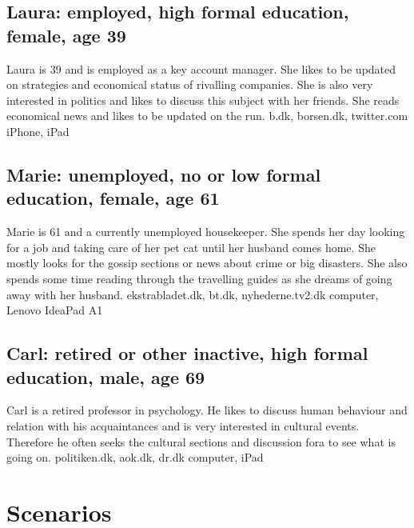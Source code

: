 \subsection{Laura: employed, high formal education, female, age 39}
Laura is 39 and is employed as a key account manager. She likes to be updated on strategies and economical status of rivalling companies. She is also very interested in politics and likes to discuss this subject with her friends. She reads economical news and likes to be updated on the run.
b.dk, borsen.dk, twitter.com
iPhone, iPad

\subsection{Marie: unemployed, no or low formal education, female, age 61}
Marie is 61 and a currently unemployed housekeeper. She spends her day looking for a job and taking care of her pet cat until her husband comes home. She mostly looks for the gossip sections or news about crime or big disasters. She also spends some time reading through the travelling guides as she dreams of going away with her husband.
ekstrabladet.dk, bt.dk, nyhederne.tv2.dk
computer, Lenovo IdeaPad A1

\subsection{Carl: retired or other inactive, high formal education, male, age 69}
Carl is a retired professor in psychology. He likes to discuss human behaviour and relation with his acquaintances and is very interested in cultural events. Therefore he often seeks the cultural sections and discussion fora to see what is going on. 
politiken.dk, aok.dk, dr.dk
computer, iPad

\section{Scenarios}
